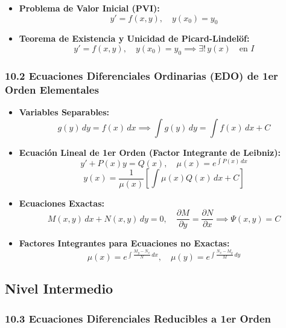 \documentclass[11pt,a4paper]{article}
\begin{document}
\begin{itemize}
  \item \textbf{Problema de Valor Inicial (PVI):}
  \[
    y' = f(x, y), \quad y(x_0) = y_0
  \]
  \item \textbf{Teorema de Existencia y Unicidad de Picard-Lindelöf:}
  \[
    y' = f(x, y), \quad y(x_0) = y_0 \implies \exists ! \, y(x) \quad \text{en } I
  \]
\end{itemize}

\subsubsection*{10.2 Ecuaciones Diferenciales Ordinarias (EDO) de 1er Orden Elementales}

\begin{itemize}
  \item \textbf{Variables Separables:}
  \[
    g(y) \, dy = f(x) \, dx \implies \int g(y) \, dy = \int f(x) \, dx + C
  \]
  \item \textbf{Ecuación Lineal de 1er Orden (Factor Integrante de Leibniz):}
  \[
    y' + P(x)y = Q(x), \quad \mu(x) = e^{\int P(x) \, dx}
  \]
  \[
    y(x) = \frac{1}{\mu(x)} \left[ \int \mu(x) Q(x) \, dx + C \right]
  \]
  \item \textbf{Ecuaciones Exactas:}
  \[
    M(x, y) \, dx + N(x, y) \, dy = 0, \quad \frac{\partial M}{\partial y} = \frac{\partial N}{\partial x} \implies \Psi(x, y) = C
  \]
  \item \textbf{Factores Integrantes para Ecuaciones no Exactas:}
  \[
    \mu(x) = e^{\int \frac{M_y - N_x}{N} \, dx}, \quad \mu(y) = e^{\int \frac{N_x - M_y}{M} \, dy}
  \]
\end{itemize}

\subsection*{Nivel Intermedio}

\subsubsection*{10.3 Ecuaciones Diferenciales Reducibles a 1er Orden}
\end{document}
